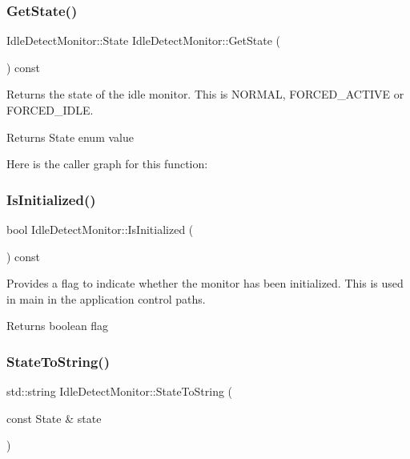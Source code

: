 \subsubsection{\texorpdfstring{Get\+State()}{GetState()}}
{\footnotesize\ttfamily Idle\+Detect\+Monitor\+::\+State Idle\+Detect\+Monitor\+::\+Get\+State (\begin{DoxyParamCaption}{ }\end{DoxyParamCaption}) const}



Returns the state of the idle monitor. This is N\+O\+R\+M\+AL, F\+O\+R\+C\+E\+D\+\_\+\+A\+C\+T\+I\+VE or F\+O\+R\+C\+E\+D\+\_\+\+I\+D\+LE. 

\begin{DoxyReturn}{Returns}
State enum value 
\end{DoxyReturn}
Here is the caller graph for this function\+:
\mbox{\label{classEventDetect_1_1IdleDetectMonitor_af945f0f33b8c0fe2c8ee33bd9ac83f12}} 
\subsubsection{\texorpdfstring{Is\+Initialized()}{IsInitialized()}}
{\footnotesize\ttfamily bool Idle\+Detect\+Monitor\+::\+Is\+Initialized (\begin{DoxyParamCaption}{ }\end{DoxyParamCaption}) const}



Provides a flag to indicate whether the monitor has been initialized. This is used in main in the application control paths. 

\begin{DoxyReturn}{Returns}
boolean flag 
\end{DoxyReturn}
\mbox{\label{classEventDetect_1_1IdleDetectMonitor_a60029f382d471e20c530cf5f61d2f71c}} 
\subsubsection{\texorpdfstring{State\+To\+String()}{StateToString()}\hspace{0.1cm}{\footnotesize\ttfamily [1/2]}}
{\footnotesize\ttfamily std\+::string Idle\+Detect\+Monitor\+::\+State\+To\+String (\begin{DoxyParamCaption}\item[{const State \&}]{state }\end{DoxyParamCaption})\hspace{0.3cm}{\ttfamily [static]}}




